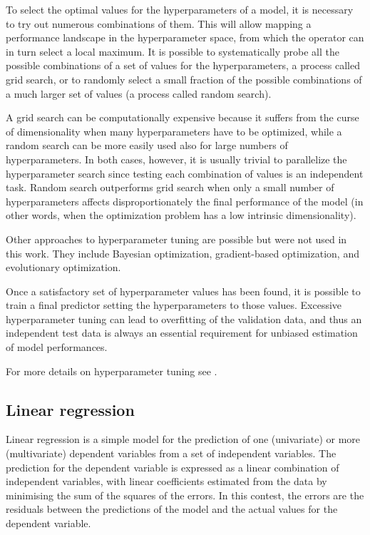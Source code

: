 To select the optimal values for the hyperparameters of a model, it is necessary to try out numerous combinations of them.
This will allow mapping a performance landscape in the hyperparameter space, from which the operator can in turn select a local maximum.
It is possible to systematically probe all the possible combinations of a set of values for the hyperparameters, a process called grid search, or to randomly select a small fraction of the possible combinations of a much larger set of values (a process called random search).

A grid search can be computationally expensive because it suffers from the curse of dimensionality when many hyperparameters have to be optimized, while a random search can be more easily used also for large numbers of hyperparameters.
In both cases, however, it is usually trivial to parallelize the hyperparameter search since testing each combination of values is an independent task.
Random search outperforms grid search when only a small number of hyperparameters affects disproportionately the final performance of the model (in other words, when the optimization problem has a low intrinsic dimensionality).

Other approaches to hyperparameter tuning are possible but were not used in this work.
They include Bayesian optimization, gradient-based optimization, and evolutionary optimization.

Once a satisfactory set of hyperparameter values has been found, it is possible to train a final predictor setting the hyperparameters to those values.
Excessive hyperparameter tuning can lead to overfitting of the validation data, and thus an independent test data is always an essential requirement for unbiased estimation of model performances.

For more details on hyperparameter tuning see \textcite{Bergstra2012, Claesen2015}.

\subsection{Linear regression}
Linear regression is a simple model for the prediction of one (univariate) or more (multivariate) dependent variables from a set of independent variables.
The prediction for the dependent variable is expressed as a linear combination of independent variables, with linear coefficients estimated from the data by minimising the sum of the squares of the errors.
In this contest, the errors are the residuals between the predictions of the model and the actual values for the dependent variable.

